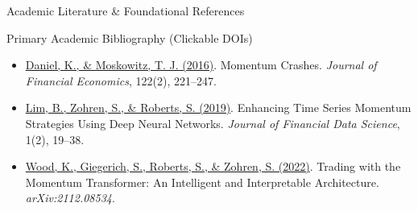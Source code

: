 \documentclass[10pt]{beamer}
\begin{document}
\begin{frame}{Academic Literature \& Foundational References}
\begin{block}{\tiny Primary Academic Bibliography (Clickable DOIs)}
\begin{itemize}
      \item \href{https://www.nber.org/papers/w20439}{Daniel, K., \& Moskowitz, T. J. (2016)}. Momentum Crashes. \emph{Journal of Financial Economics}, 122(2), 221--247.
      \item \href{https://arxiv.org/abs/1904.04912}{Lim, B., Zohren, S., \& Roberts, S. (2019)}. Enhancing Time Series Momentum Strategies Using Deep Neural Networks. \emph{Journal of Financial Data Science}, 1(2), 19--38.
      \item \href{https://arxiv.org/abs/2112.08534}{Wood, K., Giegerich, S., Roberts, S., \& Zohren, S. (2022)}. Trading with the Momentum Transformer: An Intelligent and Interpretable Architecture. \emph{arXiv:2112.08534}.
    \end{itemize}
  \end{block}
\end{frame}
\end{document}
